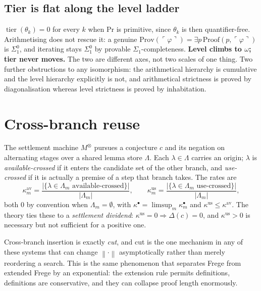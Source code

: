 \documentclass[11pt,a4paper]{article}
\newcommand{\Sig}[2]{\Sigma^{#1}_{#2}}
\newcommand{\shortest}[1]{\left\lVert #1 \right\rVert}
\newcommand{\tier}{\operatorname{tier}}
\renewcommand{\Pr}{\mathrm{Pr}}
\begin{document}
\subsection{Tier is flat along the level ladder}

$\tier(\theta_k) = 0$ for every $k$ when $\Pr$ is primitive, since $\theta_k$
is then quantifier-free. Arithmetising does not rescue it: a genuine
$\mathrm{Prov}(\ulcorner \varphi \urcorner) = \exists p\,
\mathrm{Proof}(p, \ulcorner \varphi \urcorner)$ is $\Sig{0}{1}$, and iterating
stays $\Sig{0}{1}$ by provable $\Sigma_1$-completeness. \textbf{Level climbs to
$\omega$; tier never moves.} The two are different axes, not two scales of one
thing. Two further obstructions to any isomorphism: the arithmetical hierarchy
is cumulative and the level hierarchy explicitly is not, and arithmetical
strictness is proved by diagonalisation whereas level strictness is proved by
inhabitation.

\section{Cross-branch reuse}\label{sec:kappa}

The settlement machine $M^{\otimes}$ pursues a conjecture $c$ and its negation
on alternating stages over a shared lemma store $\Lambda$. Each $\lambda \in
\Lambda$ carries an origin; $\lambda$ is \emph{available-crossed} if it enters
the candidate set of the other branch, and \emph{use-crossed} if it is actually
a premise of a step that branch takes. The rates are
\[
\kappa^{\mathrm{av}}_m = \frac{|\{\lambda \in \Lambda_m
\text{ available-crossed}\}|}{|\Lambda_m|}, \qquad
\kappa^{\mathrm{us}}_m = \frac{|\{\lambda \in \Lambda_m
\text{ use-crossed}\}|}{|\Lambda_m|},
\]
both $0$ by convention when $\Lambda_m = \emptyset$, with $\kappa^{\bullet} =
\limsup_m \kappa^{\bullet}_m$ and $\kappa^{\mathrm{us}} \le
\kappa^{\mathrm{av}}$. The theory ties these to a \emph{settlement dividend}:
$\kappa^{\mathrm{us}} = 0 \Rightarrow \Delta(c) = 0$, and
$\kappa^{\mathrm{us}} > 0$ is necessary but not sufficient for a positive one.

Cross-branch insertion is exactly \emph{cut}, and cut is the one mechanism in
any of these systems that can change $\shortest{\cdot}$ asymptotically rather
than merely reordering a search. This is the same phenomenon that separates
Frege from extended Frege by an exponential: the extension rule permits
definitions, definitions are conservative, and they can collapse proof length
enormously.
\end{document}
